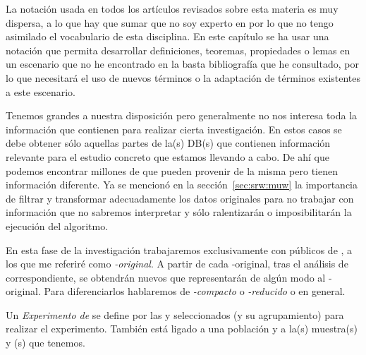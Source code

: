 \ABIERTO
La notación usada en todos los artículos revisados sobre esta materia es muy dispersa, a lo que hay que sumar que no soy experto en \Clasificacion por lo que no tengo asimilado el vocabulario de esta disciplina. En este capítulo se ha usar una notación que permita desarrollar definiciones, teoremas, propiedades o lemas en un escenario que no he encontrado en la basta bibliografía que he consultado, por lo que necesitará el uso de nuevos términos o la adaptación de términos existentes a este escenario.


Tenemos grandes \DBs a nuestra disposición pero generalmente no nos interesa toda la información que contienen para realizar cierta investigación. En estos casos se debe obtener sólo aquellas partes de la(s) DB(s) que contienen información relevante para el estudio concreto que estamos llevando a cabo. De ahí que podemos encontrar millones de \datasets que pueden provenir de la misma \DB pero tienen información diferente. Ya se mencionó en la sección~\ref{sec:srw:muw} la importancia de filtrar y transformar adecuadamente los datos originales para no trabajar con información que no sabremos interpretar y sólo ralentizarán o imposibilitarán la ejecución del algoritmo.

En esta fase de la investigación trabajaremos exclusivamente con \datasets públicos de \Clasificacion, a los que me referiré como \emph{\dataset-original}. A partir de cada \dataset-original, tras el análisis de \dm correspondiente, se obtendrán nuevos \datasets que representarán de algún modo al \dataset-original. Para diferenciarlos hablaremos de \emph{\dataset-compacto} o \emph{\dataset-reducido} o \emph{\dataset} en general.

\begin{defn}
   Un \emph{Experimento de \Clasificacion} se define por las \clases y \atributos seleccionados (y su agrupamiento) para realizar el experimento. También está ligado a una población y a la(s) muestra(s) y \dataset(s) que tenemos.
\label{def:evento-primario}
\end{defn}









